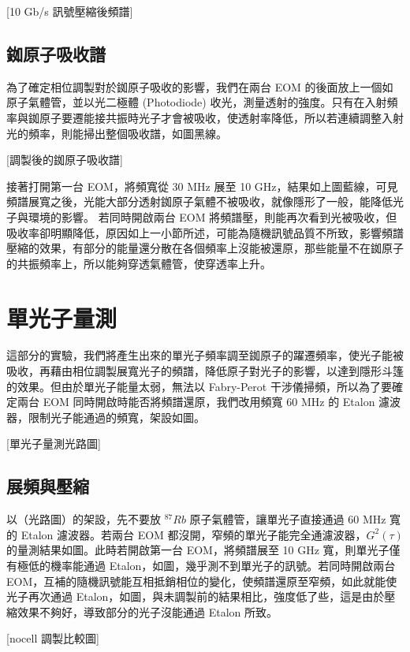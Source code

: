 \documentclass[class=NCU_thesis, crop=false]{standalone}
\begin{document}
[10 Gb/s 訊號壓縮後頻譜]

\subsection{銣原子吸收譜}

為了確定相位調製對於銣原子吸收的影響，我們在兩台 EOM 的後面放上一個如原子氣體管，並以光二極體 (Photodiode) 收光，測量透射的強度。只有在入射頻率與銣原子要遷能接共振時光子才會被吸收，使透射率降低，所以若連續調整入射光的頻率，則能掃出整個吸收譜，如圖黑線。

[調製後的銣原子吸收譜]

接著打開第一台 EOM，將頻寬從 30 MHz 展至 10 GHz，結果如上圖藍線，可見頻譜展寬之後，光能大部分透射銣原子氣體不被吸收，就像隱形了一般，能降低光子與環境的影響。
若同時開啟兩台 EOM 將頻譜壓，則能再次看到光被吸收，但吸收率卻明顯降低，原因如上一小節所述，可能為隨機訊號品質不所致，影響頻譜壓縮的效果，有部分的能量還分散在各個頻率上沒能被還原，那些能量不在銣原子的共振頻率上，所以能夠穿透氣體管，使穿透率上升。

\section{單光子量測}
這部分的實驗，我們將產生出來的單光子頻率調至銣原子的躍遷頻率，使光子能被吸收，再藉由相位調製展寬光子的頻譜，降低原子對光子的影響，以達到隱形斗篷的效果。但由於單光子能量太弱，無法以 Fabry-Perot 干涉儀掃頻，所以為了要確定兩台 EOM 同時開啟時能否將頻譜還原，我們改用頻寬 60 MHz 的 Etalon 濾波器，限制光子能通過的頻寬，架設如圖。

[單光子量測光路圖]

\subsection{展頻與壓縮}
以（光路圖）的架設，先不要放 $^{87}Rb$ 原子氣體管，讓單光子直接通過 60 MHz 寬的 Etalon 濾波器。若兩台 EOM 都沒開，窄頻的單光子能完全通濾波器，$G^{2}(\tau)$ 的量測結果如圖。此時若開啟第一台 EOM，將頻譜展至 10 GHz 寬，則單光子僅有極低的機率能通過 Etalon，如圖，幾乎測不到單光子的訊號。若同時開啟兩台 EOM，互補的隨機訊號能互相抵銷相位的變化，使頻譜還原至窄頻，如此就能使光子再次通過 Etalon，如圖，與未調製前的結果相比，強度低了些，這是由於壓縮效果不夠好，導致部分的光子沒能通過 Etalon 所致。

[nocell 調製比較圖]
\end{document}
